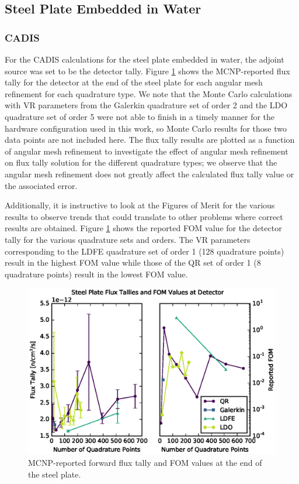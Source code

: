 \documentclass{article} %
\begin{document}
\subsection{Steel Plate Embedded in Water}

\subsubsection{CADIS}

For the CADIS calculations for the steel plate embedded in water, the adjoint
source was set to be the detector tally. Figure \ref{steel-cadis} shows
the MCNP-reported flux tally for the detector at the end of the steel plate
for each angular mesh refinement for each quadrature type. We note that the
Monte Carlo calculations with VR parameters from the Galerkin quadrature
set of order 2 and the LDO quadrature set of order 5 were not able to finish
in a timely manner for the hardware configuration used in this work, so Monte
Carlo results for those two data points are not included here. The flux tally
results are plotted as a function of angular mesh refinement to investigate
the effect of angular mesh refinement on flux tally solution for the different
quadrature types; we observe that the angular mesh refinement does not greatly
affect the calculated flux tally value or the associated error. 

Additionally, it is instructive to look at the Figures of Merit for the
various results to observe trends that could translate to other problems where
correct results are obtained. Figure \ref{steel-cadis} shows the reported
FOM value for the detector tally for the various quadrature sets and orders.
The VR parameters corresponding to the LDFE quadrature set of order 1 (128
quadrature points) result in the highest FOM value while those of the QR set of
order 1 (8 quadrature points) result in the lowest FOM value.

\begin{figure}[!htb]
\centering
\includegraphics[max height=0.445\textheight]{steel-cadis.eps}
\caption{MCNP-reported forward flux tally and FOM values at the end of the
         steel plate.}
\label{steel-cadis}
\end{figure}
\end{document}
